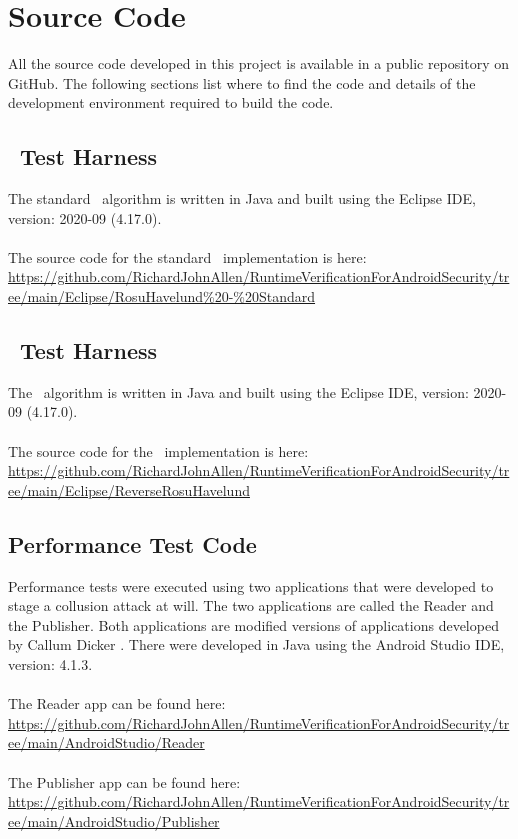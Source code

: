 \chapter{Source Code}
\label{app:Code}

All the source code developed in this project is available in a public repository on GitHub.  The following sections list where to find the code and details of the development environment required to build the code.

\section{\RH\ Test Harness}
\label{app:RHCode}

The standard \RH\ algorithm is written in Java and built using the Eclipse IDE, version: 2020-09 (4.17.0).\\
\\
\noindent The source code for the standard \RH\ implementation is here:\\
\noindent \url{https://github.com/RichardJohnAllen/RuntimeVerificationForAndroidSecurity/tree/main/Eclipse/RosuHavelund\%20-\%20Standard}

\section{\RRH\ Test Harness}
\label{app:RRHCode}

The \RRH\ algorithm is written in Java and built using the Eclipse IDE, version: 2020-09 (4.17.0).\\
\\
\noindent The source code for the \RRH\ implementation is here:\\
\noindent \url{https://github.com/RichardJohnAllen/RuntimeVerificationForAndroidSecurity/tree/main/Eclipse/ReverseRosuHavelund}

\section{Performance Test Code}
\label{app:PerformanceTestCode}

Performance tests were executed using two applications that were developed to stage a collusion attack at will.  The two applications are called the Reader and the Publisher.  Both applications are modified versions of applications developed by Callum Dicker \cite{Dicker}.  There were developed in Java using the Android Studio IDE, version: 4.1.3.\\
\\
\noindent The Reader app can be found here:\\
\noindent \url{https://github.com/RichardJohnAllen/RuntimeVerificationForAndroidSecurity/tree/main/AndroidStudio/Reader}\\
\\
\noindent The Publisher app can be found here:\\
\noindent \url{https://github.com/RichardJohnAllen/RuntimeVerificationForAndroidSecurity/tree/main/AndroidStudio/Publisher}\\

